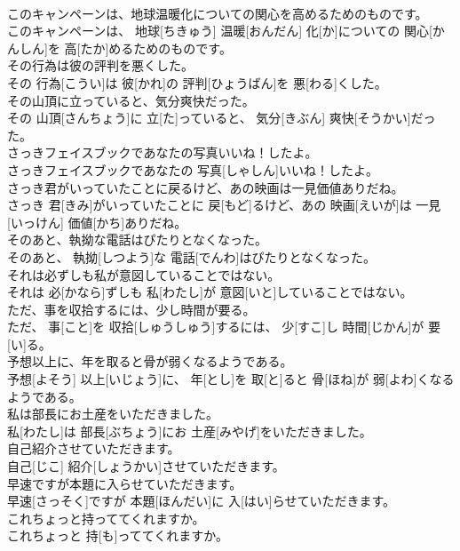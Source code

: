 \documentclass[8pt]{extreport}
\begin{document}
\begin{CJK}{UTF8}{min}
\\	このキャンペーンは、地球温暖化についての関心を高めるためのものです。	
\\	このキャンペーンは、 地球[ちきゅう] 温暖[おんだん] 化[か]についての 関心[かんしん]を 高[たか]めるためのものです。	
\\	その行為は彼の評判を悪くした。	
\\	その 行為[こうい]は 彼[かれ]の 評判[ひょうばん]を 悪[わる]くした。	
\\	その山頂に立っていると、気分爽快だった。	
\\	その 山頂[さんちょう]に 立[た]っていると、 気分[きぶん] 爽快[そうかい]だった。	
\\	さっきフェイスブックであなたの写真いいね！したよ。	
\\	さっきフェイスブックであなたの 写真[しゃしん]いいね！したよ。	
\\	さっき君がいっていたことに戻るけど、あの映画は一見価値ありだね。	
\\	さっき 君[きみ]がいっていたことに 戻[もど]るけど、あの 映画[えいが]は 一見[いっけん] 価値[かち]ありだね。	
\\	そのあと、執拗な電話はぴたりとなくなった。	
\\	そのあと、 執拗[しつよう]な 電話[でんわ]はぴたりとなくなった。	
\\	それは必ずしも私が意図していることではない。	
\\	それは 必[かなら]ずしも 私[わたし]が 意図[いと]していることではない。	
\\	ただ、事を収拾するには、少し時間が要る。	
\\	ただ、 事[こと]を 収拾[しゅうしゅう]するには、 少[すこ]し 時間[じかん]が 要[い]る。	
\\	予想以上に、年を取ると骨が弱くなるようである。	
\\	予想[よそう] 以上[いじょう]に、 年[とし]を 取[と]ると 骨[ほね]が 弱[よわ]くなるようである。	
\\	私は部長にお土産をいただきました。	
\\	私[わたし]は 部長[ぶちょう]にお 土産[みやげ]をいただきました。	
\\	自己紹介させていただきます。	
\\	自己[じこ] 紹介[しょうかい]させていただきます。	
\\	早速ですが本題に入らせていただきます。	
\\	早速[さっそく]ですが 本題[ほんだい]に 入[はい]らせていただきます。	
\\	これちょっと持っててくれますか。	
\\	これちょっと 持[も]っててくれますか。	

\end{CJK}
\end{document}
